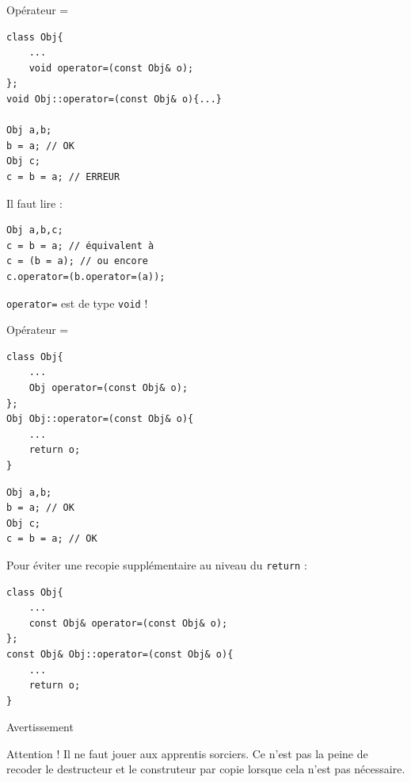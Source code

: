 \begin{frame}[fragile=singleslide]{Opérateur =}
    
        \begin{verbatim}
class Obj{
    ...
    void operator=(const Obj& o);
};
void Obj::operator=(const Obj& o){...}

Obj a,b;
b = a; // OK
Obj c;
c = b = a; // ERREUR
        \end{verbatim}
    
    Il faut lire :
    
        \begin{verbatim}
Obj a,b,c;
c = b = a; // équivalent à
c = (b = a); // ou encore
c.operator=(b.operator=(a));
        \end{verbatim}
    
    \texttt{operator=} est de type \texttt{void} !
\end{frame}

\begin{frame}[fragile=singleslide]{Opérateur =}
    
\begin{minipage}{0.48\linewidth}
        \begin{verbatim}
class Obj{
    ...
    Obj operator=(const Obj& o);
};
Obj Obj::operator=(const Obj& o){
    ...
    return o;
}
\end{verbatim}
\end{minipage}
\hfill
\begin{minipage}{0.46\linewidth}
\begin{verbatim}
Obj a,b;
b = a; // OK
Obj c;
c = b = a; // OK
        \end{verbatim}
\end{minipage}

Pour éviter une recopie supplémentaire au niveau du \texttt{return} :
    \begin{verbatim}
class Obj{
    ...
    const Obj& operator=(const Obj& o);
};
const Obj& Obj::operator=(const Obj& o){
    ...
    return o;
}
    \end{verbatim}

\end{frame}

\begin{frame}{Avertissement}
    \begin{alertblock}{Attention !}
        Il ne faut jouer aux apprentis sorciers. Ce n'est pas la peine de recoder le destructeur et le construteur par copie lorsque cela n'est pas nécessaire.
    \end{alertblock}
\end{frame}

